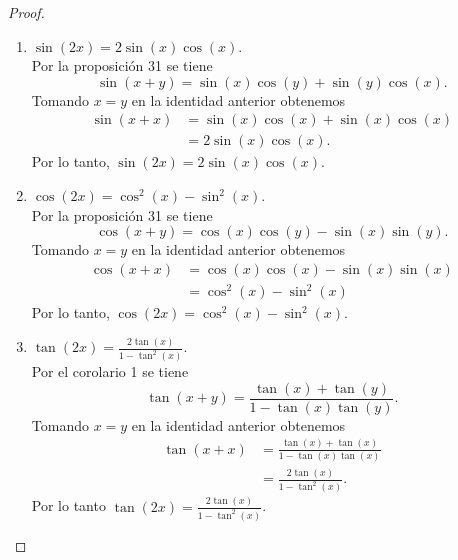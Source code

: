\documentclass[12pt,a4paper]{article}
\begin{document}
    \begin{proof}
        \begin{enumerate}
            \item[(a)] $\sin(2x)=2\sin(x)\cos(x)$.\\
            Por la proposición 31 se tiene
            \begin{equation*}
                \sin(x+y)=\sin(x)\cos(y)+\sin(y)\cos(x).
            \end{equation*}
            Tomando $x=y$ en la identidad anterior obtenemos
            \begin{align*}
                \sin(x+x)&=\sin(x)\cos(x)+\sin(x)\cos(x)\\
                &=2\sin(x)\cos(x).
            \end{align*}
            Por lo tanto, $\sin(2x)=2\sin(x)\cos(x)$.
            \item[(b)] $\cos(2x)=\cos^{2}(x)-\sin^{2}(x)$.\\
            Por la proposición 31 se tiene
            \begin{equation*}
                \cos(x+y)=\cos(x)\cos(y)-\sin(x)\sin(y).
            \end{equation*}
            Tomando $x=y$ en la identidad anterior obtenemos
            \begin{align*}
                \cos(x+x)&=\cos(x)\cos(x)-\sin(x)\sin(x)\\
                &=\cos^{2}(x)-\sin^{2}(x)
            \end{align*}
            Por lo tanto, $\cos(2x)=\cos^{2}(x)-\sin^{2}(x)$.
            \item[(c)] $\tan(2x)=\frac{2\tan(x)}{1-\tan^{2}(x)}$.\\
            Por el corolario 1 se tiene
            \begin{equation*}
                \tan(x+y)=\frac{\tan(x)+\tan(y)}{1-\tan(x)\tan(y)}.
            \end{equation*}
            Tomando $x=y$ en la identidad anterior obtenemos
            \begin{align*}
                \tan(x+x)&=\frac{\tan(x)+\tan(x)}{1-\tan(x)\tan(x)}\\
                &=\frac{2\tan(x)}{1-\tan^{2}(x)}.
            \end{align*}
            Por lo tanto $\tan(2x)=\frac{2\tan(x)}{1-\tan^{2}(x)}$.
        \end{enumerate}
    \end{proof}
\end{document}

